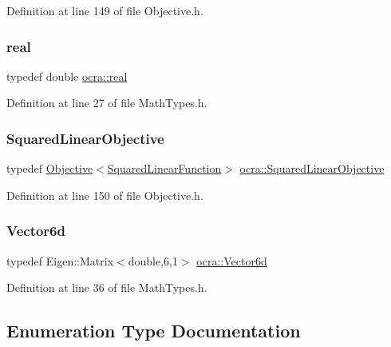Definition at line 149 of file Objective.\+h.

\hypertarget{namespaceocra_af4478308ca113669e67d72f9a3050469}{}\label{namespaceocra_af4478308ca113669e67d72f9a3050469} 
\subsubsection{\texorpdfstring{real}{real}}
{\footnotesize\ttfamily typedef double \hyperlink{namespaceocra_af4478308ca113669e67d72f9a3050469}{ocra\+::real}}



Definition at line 27 of file Math\+Types.\+h.

\hypertarget{namespaceocra_aa6eaed809f9ce42cd96ecd92ddc61f0a}{}\label{namespaceocra_aa6eaed809f9ce42cd96ecd92ddc61f0a} 
\subsubsection{\texorpdfstring{Squared\+Linear\+Objective}{SquaredLinearObjective}}
{\footnotesize\ttfamily typedef \hyperlink{classocra_1_1Objective}{Objective}$<$\hyperlink{classocra_1_1SquaredLinearFunction}{Squared\+Linear\+Function}$>$ \hyperlink{namespaceocra_aa6eaed809f9ce42cd96ecd92ddc61f0a}{ocra\+::\+Squared\+Linear\+Objective}}



Definition at line 150 of file Objective.\+h.

\hypertarget{namespaceocra_a72fe7d6cf8411efbfc475a3a78209867}{}\label{namespaceocra_a72fe7d6cf8411efbfc475a3a78209867} 
\subsubsection{\texorpdfstring{Vector6d}{Vector6d}}
{\footnotesize\ttfamily typedef Eigen\+::\+Matrix$<$double,6,1$>$ \hyperlink{namespaceocra_a72fe7d6cf8411efbfc475a3a78209867}{ocra\+::\+Vector6d}}



Definition at line 36 of file Math\+Types.\+h.



\subsection{Enumeration Type Documentation}
\hypertarget{namespaceocra_a8187c7d0d2534546e0d40cec907fd2af}{}\label{namespaceocra_a8187c7d0d2534546e0d40cec907fd2af} 
